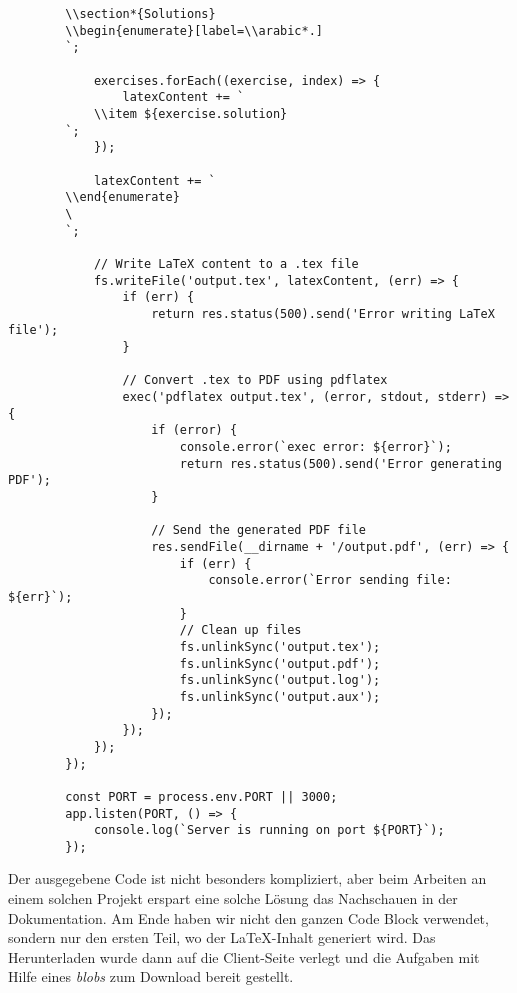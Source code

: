 \begin{description}
\begin{lstlisting}
        \\section*{Solutions}
        \\begin{enumerate}[label=\\arabic*.]
        `;
        
            exercises.forEach((exercise, index) => {
                latexContent += `
            \\item ${exercise.solution}
        `;
            });
        
            latexContent += `
        \\end{enumerate}
        \
        `;
        
            // Write LaTeX content to a .tex file
            fs.writeFile('output.tex', latexContent, (err) => {
                if (err) {
                    return res.status(500).send('Error writing LaTeX file');
                }
        
                // Convert .tex to PDF using pdflatex
                exec('pdflatex output.tex', (error, stdout, stderr) => {
                    if (error) {
                        console.error(`exec error: ${error}`);
                        return res.status(500).send('Error generating PDF');
                    }
        
                    // Send the generated PDF file
                    res.sendFile(__dirname + '/output.pdf', (err) => {
                        if (err) {
                            console.error(`Error sending file: ${err}`);
                        }
                        // Clean up files
                        fs.unlinkSync('output.tex');
                        fs.unlinkSync('output.pdf');
                        fs.unlinkSync('output.log');
                        fs.unlinkSync('output.aux');
                    });
                });
            });
        });
        
        const PORT = process.env.PORT || 3000;
        app.listen(PORT, () => {
            console.log(`Server is running on port ${PORT}`);
        });
            \end{lstlisting}
\end{description}

Der ausgegebene Code ist nicht besonders kompliziert, aber beim Arbeiten an einem solchen Projekt erspart eine solche Lösung das Nachschauen in der Dokumentation. Am Ende haben wir nicht den ganzen Code Block verwendet, sondern nur den ersten Teil, wo der \LaTeX-Inhalt generiert wird. Das Herunterladen wurde dann auf die Client-Seite verlegt und die Aufgaben mit Hilfe eines \emph{blobs} zum Download bereit gestellt. 


